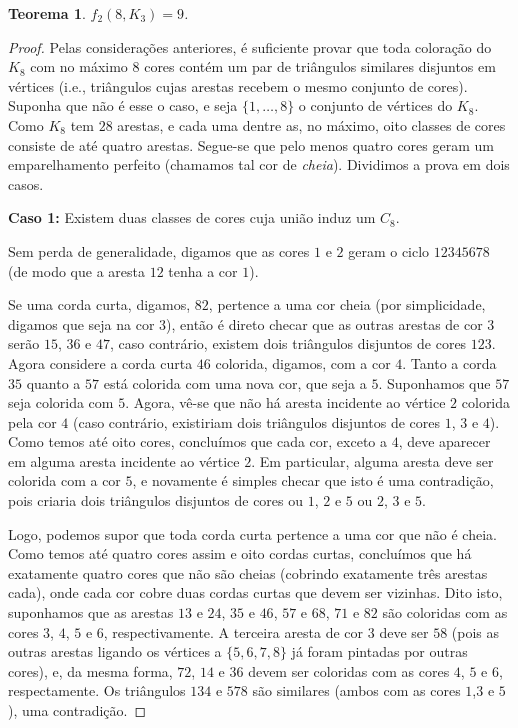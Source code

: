 \documentclass[12pt,a4paper]{book}
\newtheorem{teorema}{Teorema}[chapter]
\begin{document}
\begin{teorema}
     $f_2(8,K_3)=9$.
\end{teorema}
\begin{proof}
Pelas considerações anteriores, é suficiente provar que toda coloração do $K_8$ com no máximo $8$ cores  contém um par de triângulos similares disjuntos em vértices (i.e., triângulos cujas arestas recebem o mesmo conjunto de cores).
Suponha que não é esse o caso, e seja $\{1,\dots,8\}$ o conjunto de vértices do $K_8$. 
Como  $K_8$ tem $28$ arestas, e cada uma dentre as, no máximo, oito classes de cores consiste de até quatro  arestas. Segue-se que pelo menos quatro cores geram um emparelhamento perfeito (chamamos tal cor de \emph{cheia}). Dividimos a prova em dois casos.

\medskip
\textbf{Caso 1:} Existem duas classes de cores cuja união induz um $C_8$. 

Sem perda de generalidade, digamos que as cores $1$ e $2$ geram o ciclo $12345678$ (de modo que a aresta $12$ tenha a cor $1$). 

Se uma corda curta, digamos, $82$, pertence a uma cor cheia (por simplicidade, digamos que seja na cor $3$), então é direto checar que as outras arestas de cor $3$ serão $15$, $36$ e $47$, caso contrário, existem dois triângulos disjuntos de cores $123$. 
Agora considere a corda curta $46$ colorida, digamos, com a cor $4$. 
Tanto a corda $35$ quanto a $57$ está colorida com uma nova cor, que seja a $5$. Suponhamos que $57$ seja colorida com $5$. 
Agora, vê-se que não há aresta incidente ao vértice $2$ colorida pela cor $4$ (caso contrário, existiriam dois triângulos disjuntos de cores $1$, $3$ e $4$). 
Como temos até oito cores, concluímos que cada cor, exceto a $4$, deve aparecer em alguma aresta incidente ao vértice $2$. 
Em particular, alguma aresta deve ser colorida com a cor $5$, e novamente é simples checar que isto é uma contradição, pois criaria dois triângulos disjuntos de cores ou $1$, $2$ e $5$ ou $2$, $3$ e $5$.

Logo, podemos supor que toda corda curta pertence a uma cor que não é cheia.
Como temos até quatro cores assim e oito cordas curtas, concluímos que há exatamente quatro cores que não são cheias (cobrindo exatamente três arestas cada), onde cada cor cobre duas cordas curtas que devem ser vizinhas. 
Dito isto, suponhamos que as arestas $13$ e $24$, $35$ e $46$, $57$ e $68$, $71$ e $82$ são coloridas com as cores $3$, $4$, $5$ e $6$, respectivamente.
A terceira aresta de cor $3$ deve ser $58$ (pois as outras arestas ligando os vértices a $\{5,6,7,8\}$ já foram pintadas por outras cores), e, da mesma forma, $72$, $14$ e $36$ devem ser coloridas com as cores $4$, $5$ e $6$, respectamente. Os triângulos $134$ e $578$ são  similares (ambos com as cores $1$,$3$ e $5$), uma contradição.


\end{proof}
\end{document}
